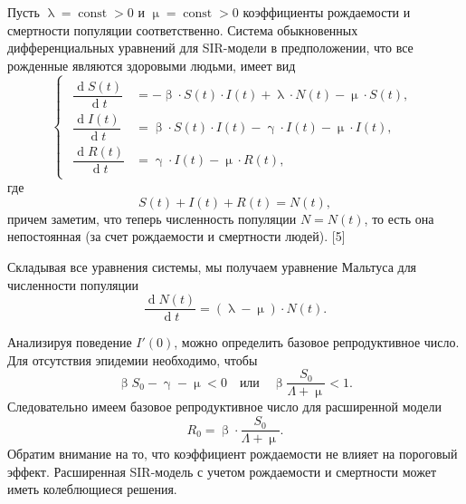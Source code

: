 \documentclass[a4paper, 12pt]{extarticle}
\numberwithin{equation}{section}
\renewcommand{\beta}{\upbeta}
\renewcommand{\gamma}{\upgamma}
\renewcommand{\lambda}{\uplambda}
\renewcommand{\mu}{\upmu}
\renewcommand{\d}{\operatorname{d}}
\begin{document}
	Пусть $\lambda = \operatorname{const} > 0$ и $\mu = \operatorname{const} > 0$ коэффициенты рождаемости и смертности популяции соответственно. Система обыкновенных дифференциальных уравнений для SIR-модели в предположении, что все рожденные являются здоровыми людьми, имеет вид 
	\begin{equation}
		\left\{ 
		\begin{gathered} 
			\begin{aligned}
				\dfrac {\d S(t)}{\d t} &= -\beta \cdot S(t) \cdot I(t) + \lambda\cdot N(t) - \mu\cdot S(t),\\
				\dfrac{\d I(t)}{\d t} &= \beta \cdot S(t)\cdot I(t) - \gamma\cdot I(t) - \mu\cdot I(t),\\
				\dfrac{\d R(t)}{\d t} &= \gamma\cdot I(t) - \mu \cdot R(t),
			\end{aligned}
		\end{gathered} 
		\right.
	\end{equation}
	где $$S(t) + I(t) + R(t) = N(t),$$ причем заметим, что теперь численность популяции $N = N(t)$, то есть она непостоянная (за счет рождаемости и смертности людей). [5]
	
	Складывая все уравнения системы, мы получаем уравнение Мальтуса для численности популяции 
	\begin{equation}
	\dfrac{\d N(t)}{\d t} = (\lambda-\mu) \cdot N(t).
	\end{equation}
	
	Анализируя поведение $I'(0)$, можно определить базовое репродуктивное число. Для отсутствия эпидемии необходимо, чтобы $$\beta S_0 - \gamma - \mu < 0 \quad \text{или}\quad \beta \dfrac{S_0}{\Lambda+\mu} < 1.$$
	Следовательно имеем базовое репродуктивное число для расширенной модели $$R_0 = \beta \cdot \dfrac{S_0}{\Lambda+\mu}.$$ Обратим внимание на то, что коэффициент рождаемости не влияет на пороговый
	эффект. Расширенная SIR-модель с учетом рождаемости и смертности может иметь колеблющиеся решения.
	
\end{document}
